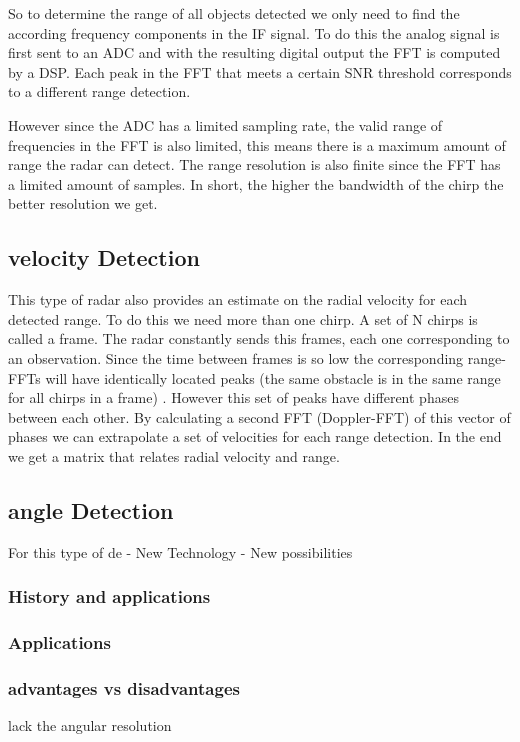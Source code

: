  So to determine the range of all objects detected we only need to find the according frequency components in the \ac{IF} signal. To do this the analog signal is first sent to an \ac{ADC} and with the resulting digital output the \ac{FFT} is computed by a \ac{DSP}. Each peak in the \ac{FFT} that meets a certain \ac{SNR} threshold corresponds to a different range detection. 
 
 However since the \ac{ADC} has a limited sampling rate, the valid range of frequencies in the \ac{FFT} is also limited, this means there is a maximum amount of range the radar can detect.
The range resolution is also finite since the \ac{FFT} has a limited amount of samples. In short, the higher the bandwidth of the chirp the better resolution we get.
 
\subsection*{velocity Detection}
This type of radar also provides an estimate on the radial velocity for each detected range. To do this we need more than one chirp. A set of N chirps is called a frame. The radar constantly sends this frames, each one corresponding to an observation. Since the time between frames is so low the corresponding range-\ac{FFT}s will have  identically located peaks (the same obstacle is in the same range for all chirps in a frame) . However this set of peaks have different phases between each other. By calculating a second \ac{FFT} (Doppler-FFT) of this vector of phases we can extrapolate a set of velocities  for each range detection. In the end we get a matrix that relates radial velocity and range.
\subsection*{angle Detection}
For this type of de
- New Technology
- New possibilities
\subsubsection{History and applications}
\subsubsection{Applications}
\subsubsection{advantages vs disadvantages}
lack the angular resolution 


